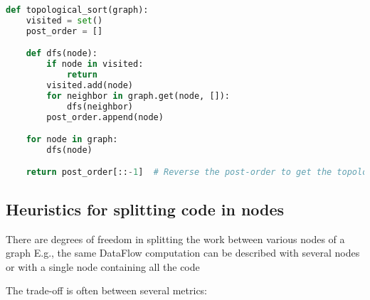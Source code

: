 \documentclass[11pt, reqno]{amsart}
\theoremstyle{definition}
\theoremstyle{remark}
\begin{document}
\begin{lstlisting}[language=Python]
def topological_sort(graph):
    visited = set()
    post_order = []

    def dfs(node):
        if node in visited:
            return
        visited.add(node)
        for neighbor in graph.get(node, []):
            dfs(neighbor)
        post_order.append(node)

    for node in graph:
        dfs(node)

    return post_order[::-1]  # Reverse the post-order to get the topological order
\end{lstlisting}

\subsection{Heuristics for splitting code in nodes}

There are degrees of freedom in splitting the work between various nodes
of a graph E.g., the same DataFlow computation can be described with
several nodes or with a single node containing all the code

The trade-off is often between several metrics:
\end{document}
